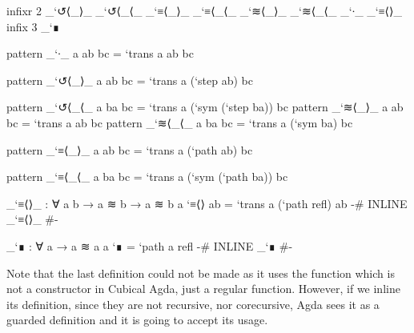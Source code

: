 \begin{code}[hide]
infixr 2 _`↺⟨_⟩_ _`↺⟨_⟨_ _`≡⟨_⟩_ _`≡⟨_⟨_ _`≋⟨_⟩_ _`≋⟨_⟨_ _`∙_ _`≡⟨⟩_
infix  3 _`∎

pattern _`∙_  {a} ab bc = `trans {a} ab bc
\end{code}
\begin{code}
pattern _`↺⟨_⟩_ a ab bc = `trans {a} (`step ab) bc
\end{code}
\begin{code}[hide]
pattern _`↺⟨_⟨_ a ba bc = `trans {a} (`sym (`step ba)) bc
pattern _`≋⟨_⟩_ a ab bc = `trans {a} ab bc
pattern _`≋⟨_⟨_ a ba bc = `trans {a} (`sym ba) bc
\end{code}
\begin{code}
pattern _`≡⟨_⟩_ a ab bc = `trans {a} (`path ab) bc
\end{code}
\begin{code}[hide]
pattern _`≡⟨_⟨_ a ba bc = `trans {a} (`sym (`path ba)) bc

_`≡⟨⟩_ : ∀ a {b} → a ≋ b → a ≋ b
a `≡⟨⟩ ab = `trans {a} (`path refl) ab
{-# INLINE _`≡⟨⟩_ #-}
\end{code}
\begin{code}
_`∎ : ∀ a → a ≋ a
a `∎ = `path {a} refl
{-# INLINE _`∎ #-}
\end{code}

Note that the last definition could not be made 
as it uses the  function which is not a constructor
in Cubical Agda, just a regular function. However, if we inline its definition,
since they are not recursive, nor corecursive, Agda sees it as a guarded definition
and it is going to accept its usage.
